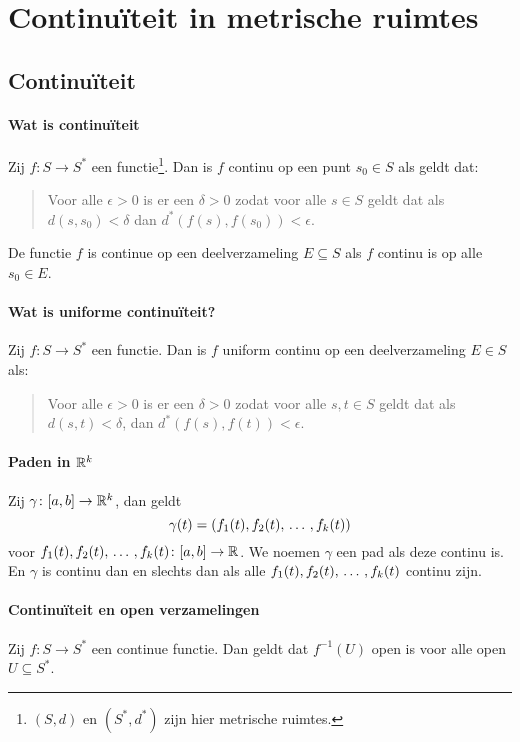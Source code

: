 \section{Continuïteit in metrische ruimtes}
\subsection{Continuïteit}
\paragraph{Wat is continuïteit} Zij \(f\colon S\to S^{*}\) een functie\footnote{\((S,d)\) en \((S^{*},d^{*})\) zijn hier metrische ruimtes.}. Dan is \(f\) continu op een punt \(s_{0}\in S\) als geldt dat:

\begin{quotation}
    Voor alle \(\epsilon>0\) is er een \(\delta>0\) zodat voor alle \(s\in S\) geldt dat als \(d(s,s_{0})<\delta\) dan \(d^{*}(f(s),f(s_{0}))<\epsilon\).
\end{quotation}

De functie \(f\) is continue op een deelverzameling \(E\subseteq S\) als \(f\) continu is op alle \(s_{0}\in E\).

\paragraph{Wat is uniforme continuïteit?} Zij \(f\colon S\to S^{*}\) een functie. Dan is \(f\) uniform continu op een deelverzameling \(E\in S\) als:

\begin{quotation}
    Voor alle \(\epsilon>0\) is er een \(\delta>0\) zodat voor alle \(s,t\in S\) geldt dat als \(d(s,t)<\delta\), dan \(d^{*}(f(s),f(t))<\epsilon\).
\end{quotation}

\paragraph{Paden in \(\mathbb{R}^{k}\)} Zij \(\gamma\colon[a,b]\to\mathbb{R}^{k}\), dan geldt
\[
    \gamma(t)=\left(f_{1}(t),f_{2}(t),\,\dots\,,f_{k}(t)\right)
\]
voor \(f_{1}(t),f_{2}(t),\,\dots\,,f_{k}(t)\colon[a,b]\to\mathbb{R}\). We noemen \(\gamma\) een pad als deze continu is. En \(\gamma\) is continu dan en slechts dan als alle \(f_{1}(t),f_{2}(t),\,\dots\,,f_{k}(t)\) continu zijn.

\paragraph{Continuïteit en open verzamelingen} Zij \(f\colon S\to S^{*}\) een continue functie. Dan geldt dat \(f^{-1}(U)\) open is voor alle open \(U\subseteq S^{*}\).


